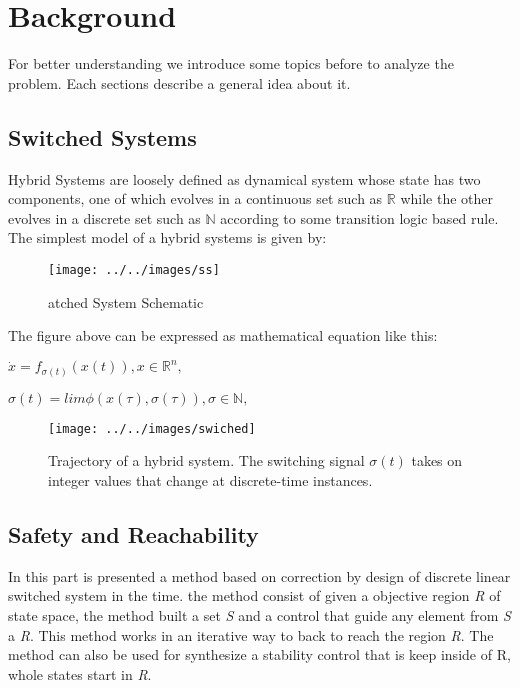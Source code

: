 \chapter{Background}

\label{ch:background}
For better understanding we introduce some topics before to analyze the
 problem. Each sections describe a general idea about it.

\section{Switched Systems}
Hybrid Systems are loosely defined as dynamical system whose state has
two components, one of which evolves in a continuous set such as 
$\mathbb{R}$  while the other evolves in a discrete set such as
 $\mathbb{N}$ according to some transition logic based rule. The 
 simplest model of a hybrid systems is given by:
  \citep{le2017improved}


\begin{figure}[!h]
    \begin{center}
        \texttt{[image: ../../images/ss]}
        \caption{atched System Schematic}
    \end{center}
\end{figure}

\newpage
The figure above can be expressed as mathematical equation like this:

\begin{center}
    ${
    \dot x = f_{\sigma(t)}(x(t)), x \in \mathbb{R}^n,
    }$
    
    ${
    \sigma(t) = lim \phi(x(\tau),\sigma(\tau)), \sigma \in \mathbb{N},
    }$
\end{center}

\begin{figure}[!h]
    \begin{center}
        \texttt{[image: ../../images/swiched]}
        \caption{Trajectory of a hybrid system. The switching signal
        ${\sigma(t)}$ takes on integer values that change at 
        discrete-time instances.\citep{liberzon2003switching}}
    \end{center}
\end{figure}

\section{Safety and Reachability}

In this part is presented a method based on correction by design of
 discrete linear switched system in the time. the method consist of 
 given a objective region \emph{R} of state space, the method built 
 a set \emph{S} and a control that guide any element from  \emph{S} 
 a \emph{R}. This method works in an iterative way to back to reach 
 the region \emph{R}. The method  can also be used for synthesize 
 a stability control that is keep inside of R, whole states start in
  \emph{R}. \cite{le2016distributed}


